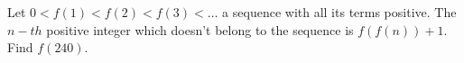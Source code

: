 Let $0<f(1)<f(2)<f(3)<\ldots$ a sequence with all its terms positive$.$ The $n-th$ positive integer which doesn't belong to the sequence is $f(f(n))+1.$ Find $f(240).$